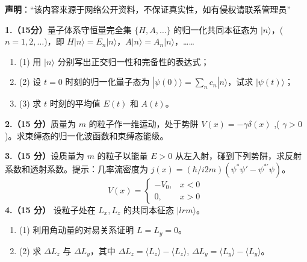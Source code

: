 
\textbf{声明}：“该内容来源于网络公开资料，不保证真实性，如有侵权请联系管理员”

\textbf{1.（15分）}量子体系守恒量完全集 $\{H, A, \dots\}$ 的归一化共同本征态为 $|n\rangle$，($n=1, 2, \dots$)，即 $H|n\rangle = E_n|n\rangle$，$A|n\rangle = A_n|n\rangle$，……
\begin{enumerate}
    \item (1) 用 $|n\rangle$ 分别写出正交归一性和完备性的表达式；
    \item (2) 设 $t=0$ 时刻的归一化量子态为 $|\psi(0)\rangle = \sum_n c_n |n\rangle$，试求 $|\psi(t)\rangle$；
    \item (3) 求 $t$ 时刻的平均值 $E(t)$ 和 $A(t)$。
\end{enumerate}
\textbf{2.（15 分）}质量为 $m$ 的粒子作一维运动，处于势阱 $V(x) = -\gamma \delta(x)$ ,( $\gamma > 0$ )。求束缚态的归一化波函数和束缚态能级。

\textbf{3.（15 分）}设质量为 $m$ 的粒子以能量 $E > 0$ 从左入射，碰到下列势阱，求反射系数和透射系数。提示：几率流密度为 $j(x) =(\hbar/i2m)(\psi^*\psi'  - \psi^{*'}\psi)$。
$$V(x) = \begin{cases} 
-V_0, & x < 0 \\ 
0, & x > 0 
\end{cases}~$$
\textbf{4.（15 分）}
设粒子处在 $L_x, L_z$ 的共同本征态 $|lrm\rangle$。

\begin{enumerate}
    \item (1) 利用角动量的对易关系证明 $L = L_y = 0$。
    \item (2) 求 $\Delta L_z$ 与 $\Delta L_y$，其中 $\Delta L_z = \langle L_z \rangle - \langle L_z \rangle$, $\Delta L_y = \langle L_y \rangle - \langle L_y \rangle$。
\end{enumerate}
